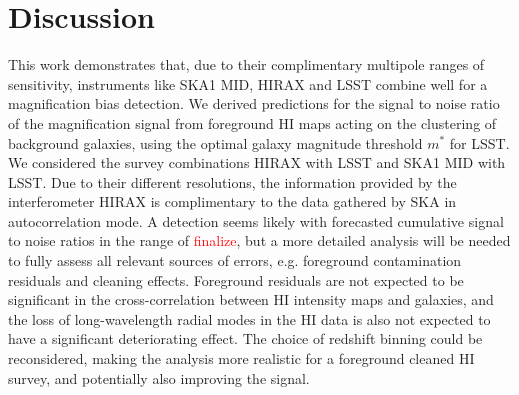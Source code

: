 \documentclass[useAMS,usenatbib]{mnras}
\newcommand{\ama}[1]{\textcolor{red}{{#1}}}
\begin{document}
\section{Discussion}
This work demonstrates that, due to their complimentary multipole ranges of sensitivity, instruments like SKA1 MID, HIRAX and LSST combine well for a magnification bias detection. We derived predictions for the signal to noise ratio of the magnification signal from foreground HI maps acting on the clustering of background galaxies, using the optimal galaxy magnitude threshold $m^*$ for LSST. We considered the survey combinations HIRAX with LSST and SKA1 MID with LSST. Due to their different resolutions, the information provided by the interferometer HIRAX is complimentary to the data gathered by SKA in autocorrelation mode. A detection seems likely with forecasted cumulative signal to noise ratios in the range of \ama{finalize}, but a more detailed analysis will be needed to fully assess all relevant sources of errors, e.g. foreground contamination residuals and cleaning effects. Foreground residuals are not expected to be significant in the cross-correlation between HI intensity maps and galaxies, and the loss of long-wavelength radial modes in the HI data is also not expected to have a significant deteriorating effect. The choice of redshift binning could be reconsidered, making the analysis more realistic for a foreground cleaned HI survey, and potentially also improving the signal.



% 


\end{document}
